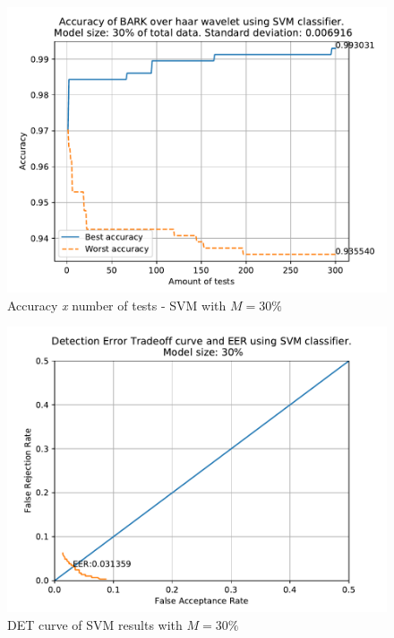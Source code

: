 		\begin{figure}[H]
			\centering
			\includegraphics[scale=.8]{images/results/confusionMatrices/classifier_SVM_30.pdf}
			\caption{Accuracy \textit{x} number of tests - SVM with $M=30\%$}
			\label{fig:classifiersvm30}
		\end{figure}
		\begin{figure}[H]
			\centering
			\includegraphics[scale=.8]{images/results/det/DET_for_classifier_SVM_30.pdf}
			\caption{DET curve of SVM results with $M=30\%$}
			\label{fig:detsvm30}
		\end{figure}
